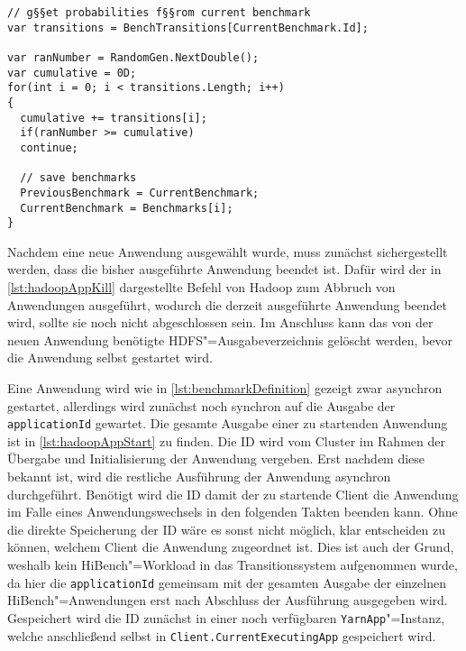\begin{lstlisting}[label=lst:benchmarkChanging,style=cs,
caption={[Normalisierung und Auswahl der nachfolgenden Anwendung]
    Normalisierung und Auswahl der nachfolgenden Anwendung (gekürzt)}]
// g§§et probabilities f§§rom current benchmark
var transitions = BenchTransitions[CurrentBenchmark.Id];

var ranNumber = RandomGen.NextDouble();
var cumulative = 0D;
for(int i = 0; i < transitions.Length; i++)
{
  cumulative += transitions[i];
  if(ranNumber >= cumulative)
  continue;
  
  // save benchmarks
  PreviousBenchmark = CurrentBenchmark;
  CurrentBenchmark = Benchmarks[i];
}
\end{lstlisting}

Nachdem eine neue Anwendung ausgewählt wurde, muss zunächst sichergestellt werden, dass die bisher ausgeführte Anwendung beendet ist.
Dafür wird der in \cref{lst:hadoopAppKill} dargestellte Befehl von Hadoop zum Abbruch von Anwendungen ausgeführt, wodurch die derzeit ausgeführte Anwendung beendet wird, sollte sie noch nicht abgeschlossen sein.
Im Anschluss kann das von der neuen Anwendung benötigte \ac{HDFS}"=Ausgabeverzeichnis gelöscht werden, bevor die Anwendung selbst gestartet wird.

Eine Anwendung wird wie in \cref{lst:benchmarkDefinition} gezeigt zwar asynchron gestartet, allerdings wird zunächst noch synchron auf die Ausgabe der \texttt{applicationId} gewartet.
Die gesamte Ausgabe einer zu startenden Anwendung ist in \cref{lst:hadoopAppStart} zu finden.
Die ID wird vom Cluster im Rahmen der Übergabe und Initialisierung der Anwendung vergeben.
Erst nachdem diese bekannt ist, wird die restliche Ausführung der Anwendung asynchron durchgeführt.
Benötigt wird die ID damit der zu startende Client die Anwendung im Falle eines Anwendungswechsels in den folgenden Takten beenden kann.
Ohne die direkte Speicherung der ID wäre es sonst nicht möglich, klar entscheiden zu können, welchem Client die Anwendung zugeordnet ist.
Dies ist auch der Grund, weshalb kein HiBench"=Workload in das Transitionssystem aufgenommen wurde, da hier die \texttt{applicationId} gemeinsam mit der gesamten Ausgabe der einzelnen HiBench"=Anwendungen erst nach Abschluss der Ausführung ausgegeben wird.
Gespeichert wird die ID zunächst in einer noch verfügbaren \texttt{YarnApp}"=Instanz, welche anschließend selbst in \texttt{Client.CurrentExecutingApp} gespeichert wird.

